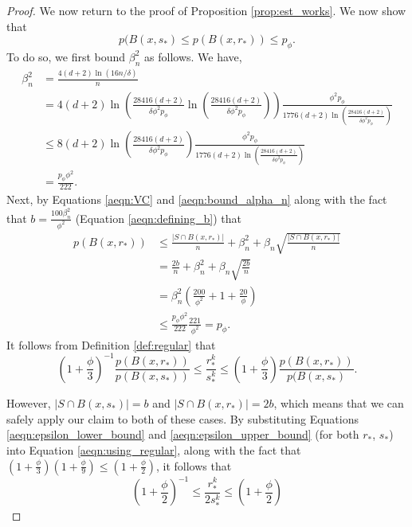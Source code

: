 \begin{proof}
We now return to the proof of Proposition \ref{prop:est_works}. We now show that $$p(B(x, s_*) \leq p(B(x, r_*)) \leq p_\phi.$$ To do so, we first bound $\beta_n^2$ as follows. We have, 
\begin{equation}\label{aeqn:bound_alpha_n}
\begin{split}
\beta_n^2 &= \frac{4(d+2)\ln(16n/\delta)}{n} \\
&= 4(d+2) \ln \left(\frac{28416(d+2)}{\delta \phi^2 p_\phi}\ln\left(\frac{28416(d+2)}{\delta \phi^2 p_\phi} \right)\right) \frac{\phi^2 p_\phi}{1776(d+2)\ln \left(\frac{28416(d+2)}{\delta \phi^2 p_\phi} \right)} \\
&\leq 8(d+2)\ln \left(\frac{28416(d+2)}{\delta \phi^2 p_\phi}\right) \frac{\phi^2 p_\phi}{1776(d+2)\ln \left(\frac{28416(d+2)}{\delta \phi^2 p_\phi} \right)} \\
&= \frac{p_\phi \phi^2}{222}.
\end{split}
\end{equation}
Next, by Equations \ref{aeqn:VC} and \ref{aeqn:bound_alpha_n} along with the fact that $b = \frac{100\beta_n^2}{\phi^2}$ (Equation \ref{aeqn:defining_b}) that 
\begin{equation*}
\begin{split}
p(B(x, r_*)) &\leq \frac{|S \cap B(x, r_*)|}{n} + \beta_n^2 + \beta_n \sqrt{\frac{|S \cap B(x, r_*)|}{n}} \\
&= \frac{2b}{n} + \beta_n^2 + \beta_n\sqrt{\frac{2b}{n}} \\
&= \beta_n^2\left(\frac{200}{\phi^2} +1 + \frac{20}{\phi}\right) \\
&\leq \frac{p_\phi \phi^2}{222}\frac{221}{\phi^2}  = p_\phi.
\end{split}
\end{equation*}
It follows from Definition \ref{def:regular} that 
\begin{equation}\label{aeqn:using_regular}
\left(1 + \frac{\phi}{3}\right)^{-1}\frac{p(B(x, r_*))}{p(B(x, s_*))} \leq \frac{r_*^k}{s_*^k} \leq \left(1 + \frac{\phi}{3}\right)\frac{p(B(x, r_*))}{p(B(x, s_*)}.\end{equation} 

However, $|S \cap B(x, s_*)| = b$ and $|S \cap B(x, r_*)| = 2b$, which means that we can safely apply our claim to both of these cases. By substituting Equations \ref{aeqn:epsilon_lower_bound} and \ref{aeqn:epsilon_upper_bound} (for both $r_*$, $s_*$) into Equation \ref{aeqn:using_regular}, along with the fact that $\left(1+\frac{\phi}{3}\right)\left(1 + \frac{\phi}{9}\right) \leq \left(1 + \frac{\phi}{2}\right)$, it follows that 
\begin{equation}\label{aeqn:bound_ratio}
\left(1 + \frac{\phi}{2}\right)^{-1} \leq \frac{r_*^k}{2s_*^k} \leq \left(1 + \frac{\phi}{2}\right)
\end{equation}


\end{proof}

